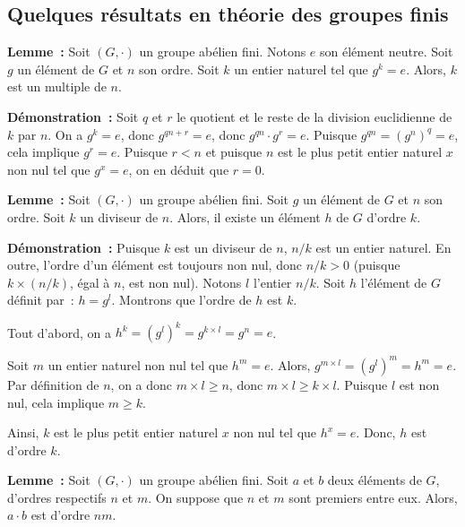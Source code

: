 \subsection{Quelques résultats en théorie des groupes finis}

\noindent\textbf{Lemme :} Soit $(G, \cdot)$ un groupe abélien fini. 
    Notons $e$ son élément neutre.
    Soit $g$ un élément de $G$ et $n$ son ordre. 
    Soit $k$ un entier naturel tel que $g^k = e$. 
    Alors, $k$ est un multiple de $n$.

\medskip

\noindent\textbf{Démonstration :} 
    Soit $q$ et $r$ le quotient et le reste de la division euclidienne de $k$ par $n$.
    On a $g^k = e$, donc $g^{q n + r} = e$, donc $g^{q n} \cdot g^r = e$.
    Puisque $g^{q n} = (g^n)^q = e$, cela implique $g^r = e$.
    Puisque $r < n$ et puisque $n$ est le plus petit entier naturel $x$ non nul tel que $g^x = e$, on en déduit que $r = 0$.

    \done

\medskip

\noindent\textbf{Lemme :} Soit $(G, \cdot)$ un groupe abélien fini. 
    Soit $g$ un élément de $G$ et $n$ son ordre. 
    Soit $k$ un diviseur de $n$. 
    Alors, il existe un élément $h$ de $G$ d'ordre $k$.

\medskip

\noindent\textbf{Démonstration :} 
    Puisque $k$ est un diviseur de $n$, $n / k$ est un entier naturel. 
    En outre, l'ordre d'un élément est toujours non nul, donc $n / k > 0$ (puisque $k \times (n / k)$, égal à $n$, est non nul).
    Notons $l$ l'entier $n / k$.
    Soit $h$ l'élément de $G$ définit par : $h = g^l$.
    Montrons que l'ordre de $h$ est $k$. 

    Tout d'abord, on a $h^k = (g^l)^k = g^{k \times l} = g^n = e$.

    Soit $m$ un entier naturel non nul tel que $h^m = e$. 
    Alors, $g^{m \times l} = (g^l)^m = h^m = e$. 
    Par définition de $n$, on a donc $m \times l \geq n$, donc $m \times l \geq k \times l$. 
    Puisque $l$ est non nul, cela implique $m \geq k$. 

    Ainsi, $k$ est le plus petit entier naturel $x$ non nul tel que $h^x = e$.
    Donc, $h$ est d'ordre $k$.

    \done

\medskip

\noindent\textbf{Lemme :} Soit $(G, \cdot)$ un groupe abélien fini.
    Soit $a$ et $b$ deux éléments de $G$, d'ordres respectifs $n$ et $m$. 
    On suppose que $n$ et $m$ sont premiers entre eux. 
    Alors, $a \cdot b$ est d'ordre $n m$.


